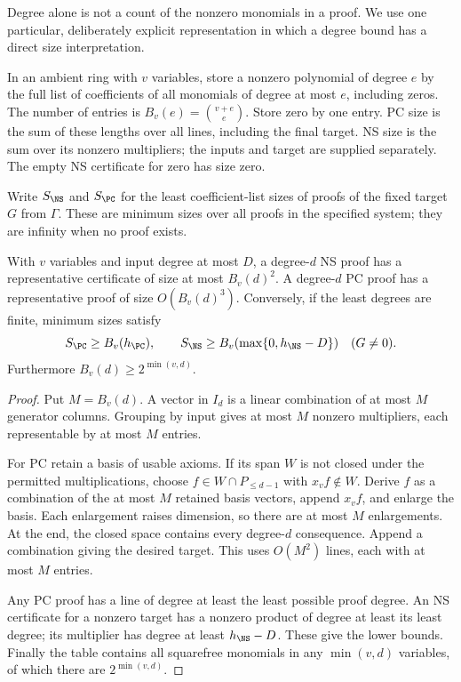 Degree alone is not a count of the nonzero monomials in a proof. We use
one particular, deliberately explicit representation in which a degree
bound has a direct size interpretation.

\begin{definition}\label{tx:def:dense-size}
In an ambient ring with $v$ variables, store a nonzero polynomial of
degree $e$ by the full list of coefficients of all monomials of degree
at most $e$, including zeros. The number of entries is
$B_v(e)=\binom{v+e}{e}$. Store zero by one entry. PC size is the sum of
these lengths over all lines, including the final target. NS size is
the sum over its nonzero multipliers; the inputs and target are supplied
separately. The empty NS certificate for zero has size zero.
\end{definition}

Write $S_{\NS}$ and $S_{\PC}$ for the least coefficient-list sizes of
proofs of the fixed target $G$ from $\Gamma$. These are minimum sizes
over all proofs in the specified system; they are infinity when no
proof exists.

\begin{lemma}\label{tx:lem:dense-size}
With $v$ variables and input degree at most $D$, a degree-$d$ NS proof
has a representative certificate of size at most $B_v(d)^2$. A
 degree-$d$ PC proof has a representative proof of size $O(B_v(d)^3)$.
Conversely, if the least degrees are finite, minimum sizes satisfy
\[
 S_{\PC}\ge B_v(h_{\PC}),\qquad
 S_{\NS}\ge B_v(\max\{0,h_{\NS}-D\})\quad(G\ne0).
\]
Furthermore $B_v(d)\ge2^{\min(v,d)}$.
\end{lemma}
\begin{proof}
Put $M=B_v(d)$. A vector in $I_d$ is a linear combination of at most
$M$ generator columns. Grouping by input gives at most $M$ nonzero
multipliers, each representable by at most $M$ entries.

For PC retain a basis of usable axioms. If its span $W$ is not closed
under the permitted multiplications, choose
$f\in W\cap P_{\le d-1}$ with $x_vf\notin W$. Derive $f$ as a
combination of the at most $M$ retained basis vectors, append $x_vf$,
and enlarge the basis. Each enlargement raises dimension, so there are
at most $M$ enlargements. At the end, the closed space contains every
degree-$d$ consequence. Append a combination giving the desired target.
This uses $O(M^2)$ lines, each with at most $M$ entries.

Any PC proof has a line of degree at least the least possible proof
degree. An NS certificate for a nonzero target has a nonzero product
of degree at least its least degree; its multiplier has degree at least
$h_{\NS}-D$. These give the lower bounds. Finally the table contains
all squarefree monomials in any $\min(v,d)$ variables, of which there
are $2^{\min(v,d)}$.
\end{proof}

